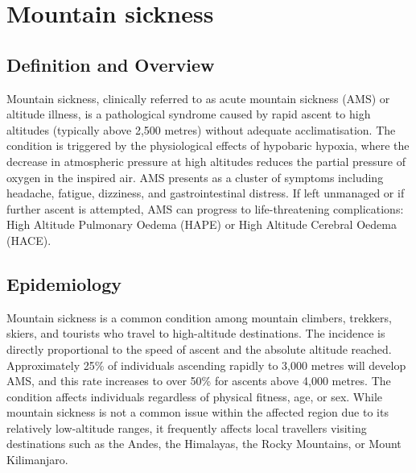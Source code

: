 \chapter{Mountain sickness}

\section*{Definition and Overview}
Mountain sickness, clinically referred to as acute mountain sickness (AMS) or altitude illness, is a pathological syndrome caused by rapid ascent to high altitudes (typically above 2,500 metres) without adequate acclimatisation. The condition is triggered by the physiological effects of hypobaric hypoxia, where the decrease in atmospheric pressure at high altitudes reduces the partial pressure of oxygen in the inspired air. AMS presents as a cluster of symptoms including headache, fatigue, dizziness, and gastrointestinal distress. If left unmanaged or if further ascent is attempted, AMS can progress to life-threatening complications: High Altitude Pulmonary Oedema (HAPE) or High Altitude Cerebral Oedema (HACE).

\section*{Epidemiology}
Mountain sickness is a common condition among mountain climbers, trekkers, skiers, and tourists who travel to high-altitude destinations. The incidence is directly proportional to the speed of ascent and the absolute altitude reached. Approximately 25\% of individuals ascending rapidly to 3,000 metres will develop AMS, and this rate increases to over 50\% for ascents above 4,000 metres. The condition affects individuals regardless of physical fitness, age, or sex. While mountain sickness is not a common issue within the affected region due to its relatively low-altitude ranges, it frequently affects local travellers visiting destinations such as the Andes, the Himalayas, the Rocky Mountains, or Mount Kilimanjaro.

